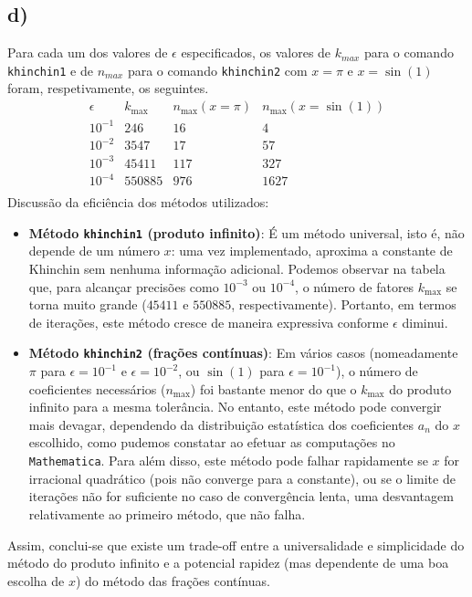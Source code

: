 \documentclass[12pt,a4paper]{article}
\begin{document}
    \subsection{d)}
        Para cada um dos valores de \(\epsilon\) especificados, os valores de \(k_{max}\) para o comando \texttt{khinchin1} e de \(n_{max}\) para o comando \texttt{khinchin2} com \(x = \pi\) e \(x = \sin(1)\) foram, respetivamente, os seguintes.
        \[\begin{array}{c|ccc}
            \epsilon & k_{\max} & n_{\max} (x=\pi) & n_{\max}(x=\sin(1)) \\
            \hline
            10^{-1} & 246 & 16 & 4 \\
            10^{-2} & 3547 & 17 & 57 \\
            10^{-3} & 45411 & 117 & 327 \\
            10^{-4} & 550885 & 976 & 1627 \\
        \end{array}\]
        Discussão da eficiência dos métodos utilizados:
        \begin{itemize}
        \item \textbf{Método \texttt{khinchin1} (produto infinito)}: 
            É um método universal, isto é, não depende de um número \(x\): uma vez implementado, aproxima a constante de Khinchin sem nenhuma informação adicional. Podemos observar na tabela que, para alcançar precisões como \(10^{-3}\) ou \(10^{-4}\), o número de fatores \(k_{\max}\) se torna muito grande (\(45411\) e \(550885\), respectivamente). Portanto, em termos de iterações, este método cresce de maneira expressiva conforme \(\epsilon\) diminui.
        \item \textbf{Método \texttt{khinchin2} (frações contínuas)}:
            Em vários casos (nomeadamente \(\pi\) para \(\epsilon=10^{-1}\) e \(\epsilon=10^{-2}\), ou \(\sin(1)\) para \(\epsilon=10^{-1}\)), o número de coeficientes necessários (\(n_{\max}\)) foi bastante menor do que o \(k_{\max}\) do produto infinito para a mesma tolerância. No entanto, este método pode convergir mais devagar, dependendo da distribuição estatística dos coeficientes \(a_n\) do \(x\) escolhido, como pudemos constatar ao efetuar as computações no \texttt{Mathematica}. Para além disso, este método pode falhar rapidamente se \(x\) for irracional quadrático (pois não converge para a constante), ou se o limite de iterações não for suficiente no caso de convergência lenta, uma desvantagem relativamente ao primeiro método, que não falha.
        \end{itemize}
        Assim, conclui-se que existe um trade-off entre a universalidade e simplicidade do método do produto infinito e a potencial rapidez (mas dependente de uma boa escolha de \(x\)) do método das frações contínuas.
\end{document}

